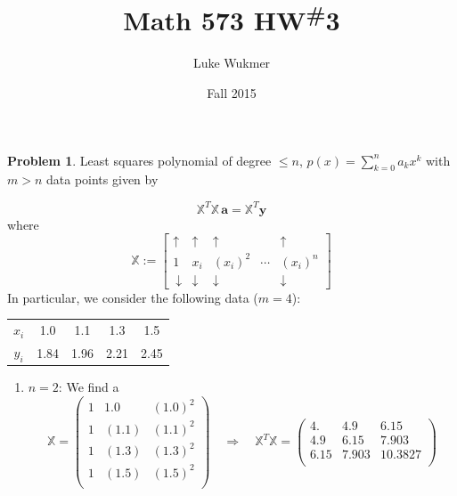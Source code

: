 \documentclass[10pt]{article}
\theoremstyle{plain}
\theoremstyle{definition}
\newtheorem{prob}{Problem}
\numberwithin{equation}{section}
\begin{document}
\title{Math 573 HW\textsuperscript{\#}3}
\author{Luke Wukmer}
\date{Fall 2015}
\maketitle \thispagestyle{empty} %

\begin{prob}
    Least squares polynomial of degree $\leq n$, $p(x) = \sum_{k=0}^n a_k x^k$
    with $m>n$ data points given by

    \[      \mathbb{X}^T\mathbb{X}\, \bm{a} = \mathbb{X}^T \bm{y}
    \]
    where \[
            \mathbb{X} := \begin{bmatrix}
                \uparrow & \uparrow & \uparrow &    & \uparrow \\
            1       & x_i & (x_i)^2 & \cdots & (x_i)^n      \\\
            \downarrow & \downarrow & \downarrow &  & \downarrow 
            \end{bmatrix}
\]
In particular, we consider the following data ($m=4$):
    \begin{center}
        \begin{tabular}{c c c c c}
        \hline
        $x_i$ & 1.0 & 1.1 & 1.3 & 1.5 \\
        $y_i$ & 1.84 & 1.96 & 2.21 & 2.45\\
        \hline
        \end{tabular}
    \end{center}
\begin{enumerate}[\bfseries(a)]
\item $n=2$: We find a 
    \[
            \mathbb{X} = \begin{pmatrix}
                1 & 1.0 & (1.0)^2 \\
                1 & (1.1) & (1.1)^2 \\
                1 & (1.3) & (1.3)^2 \\
                1 & (1.5) & (1.5)^2 \\
            \end{pmatrix}
            \quad \Longrightarrow \quad
            \mathbb{X}^T\mathbb{X} = 
            \begin{pmatrix} 
            4.    &   4.9   &   6.15  \\
            4.9   &   6.15  &   7.903 \\
            6.15  &   7.903 &  10.3827\\
        \end{pmatrix}
\]
\end{enumerate}
\end{prob}
\end{document}

